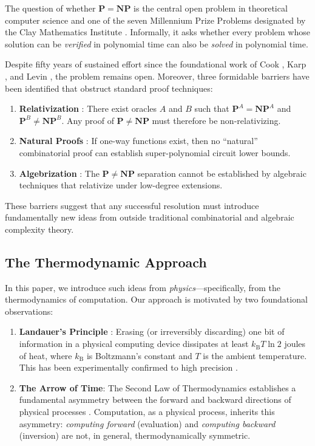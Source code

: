 \documentclass[12pt, a4paper]{article}
\newcommand{\Pc}{\mathbf{P}}
\newcommand{\NPc}{\mathbf{NP}}
\newcommand{\kB}{k_{\text{B}}}
\theoremstyle{plain}
\theoremstyle{definition}
\theoremstyle{remark}
\begin{document}
The question of whether $\Pc = \NPc$ is the central open problem in theoretical
computer science and one of the seven Millennium Prize Problems designated by the
Clay Mathematics Institute \citep{ClayPNP, CookStatement}. Informally, it asks
whether every problem whose solution can be \emph{verified} in polynomial time
can also be \emph{solved} in polynomial time.

Despite fifty years of sustained effort since the foundational work of
Cook \citep{Cook1971}, Karp \citep{Karp1972}, and Levin \citep{Levin1973},
the problem remains open. Moreover, three formidable barriers have been
identified that obstruct standard proof techniques:
\begin{enumerate}[label=(\roman*)]
  \item \textbf{Relativization} \citep{BakerGillSolovay1975}: There exist
    oracles $A$ and $B$ such that $\Pc^A = \NPc^A$ and $\Pc^B \neq \NPc^B$.
    Any proof of $\Pc \neq \NPc$ must therefore be non-relativizing.
  \item \textbf{Natural Proofs} \citep{RazborovRudich1997}: If one-way
    functions exist, then no ``natural'' combinatorial proof can establish
    super-polynomial circuit lower bounds.
  \item \textbf{Algebrization} \citep{AaronsonWigderson2009}: The
    $\Pc \neq \NPc$ separation cannot be established by algebraic
    techniques that relativize under low-degree extensions.
\end{enumerate}

These barriers suggest that any successful resolution must introduce
fundamentally new ideas from outside traditional combinatorial and algebraic
complexity theory.

\subsection{The Thermodynamic Approach}

In this paper, we introduce such ideas from \emph{physics}---specifically,
from the thermodynamics of computation. Our approach is motivated by two
foundational observations:

\begin{enumerate}[label=(\alph*)]
  \item \textbf{Landauer's Principle} \citep{Landauer1961}: Erasing
    (or irreversibly discarding) one bit of information in a physical
    computing device dissipates at least $\kB T \ln 2$ joules of heat,
    where $\kB$ is Boltzmann's constant and $T$ is the ambient temperature.
    This has been experimentally confirmed to high precision
    \citep{BeruttEtAl2012}.

  \item \textbf{The Arrow of Time}: The Second Law of Thermodynamics
    establishes a fundamental asymmetry between the forward and backward
    directions of physical processes \citep{Boltzmann1877}. Computation,
    as a physical process, inherits this asymmetry: \emph{computing forward}
    (evaluation) and \emph{computing backward} (inversion) are not, in
    general, thermodynamically symmetric.
\end{enumerate}
\end{document}
